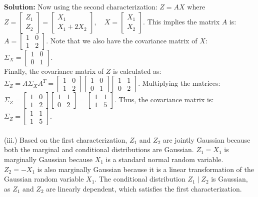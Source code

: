 \documentclass{article}
\newenvironment{solution}{\color{blue} \smallskip \textbf{Solution:}}{}
\begin{document}
\begin{enumerate}[(a)]
\begin{solution}
Now using the second characterization: \(Z = A X\) where \(Z = \begin{bmatrix} Z_1 \\ Z_2 \end{bmatrix} = \begin{bmatrix} X_1 \\ X_1 + 2X_2 \end{bmatrix}, \quad X = \begin{bmatrix} X_1 \\ X_2 \end{bmatrix}\). This implies the matrix \(A\) is: \(A = \begin{bmatrix} 1 & 0 \\ 1 & 2 \end{bmatrix}\). Note that we also have the covariance matrix of \(X\): \(\Sigma_X = \begin{bmatrix} 1 & 0 \\ 0 & 1 \end{bmatrix}\).\\

Finally, the covariance matrix of \(Z\) is calculated as: \(\Sigma_Z = A \Sigma_X A^T = \begin{bmatrix} 1 & 0 \\ 1 & 2 \end{bmatrix} \begin{bmatrix} 1 & 0 \\ 0 & 1 \end{bmatrix} \begin{bmatrix} 1 & 1 \\ 0 & 2 \end{bmatrix}\). Multiplying the matrices: \(\Sigma_Z = \begin{bmatrix} 1 & 0 \\ 1 & 2 \end{bmatrix} \begin{bmatrix} 1 & 1 \\ 0 & 2 \end{bmatrix} = \begin{bmatrix} 1 & 1 \\ 1 & 5 \end{bmatrix}\). Thus, the covariance matrix is: \(\Sigma_Z = \begin{bmatrix} 1 & 1 \\ 1 & 5 \end{bmatrix}\).\\\\

(iii.)
Based on the first characterization, \(Z_1\) and \(Z_2\) are jointly Gaussian because both the marginal and conditional distributions are Gaussian. 
\(Z_1 = X_1\) is marginally Gaussian because \(X_1\) is a standard normal random variable. 
\(Z_2 = -X_1\) is also marginally Gaussian because it is a linear transformation of the Gaussian random variable \(X_1\). The conditional distribution \(Z_1 \mid Z_2\) is Gaussian, as \(Z_1\) and \(Z_2\) are linearly dependent, which satisfies the first characterization.\\


\end{solution}
\end{enumerate}
\end{document}
